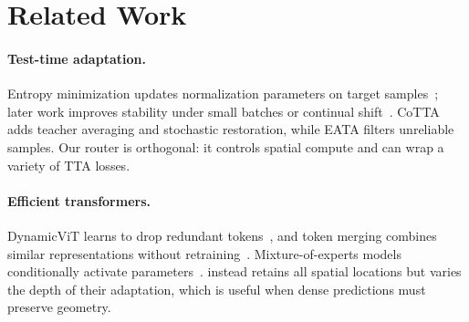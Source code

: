 \section{Related Work}
\label{sec:related}

\paragraph{Test-time adaptation.}
Entropy minimization updates normalization parameters on target
samples~\citep{wang2021tent}; later work improves stability under small batches
or continual shift~\citep{niu2022efficient,wang2022continual}.  CoTTA adds
teacher averaging and stochastic restoration, while EATA filters unreliable
samples.  Our router is orthogonal: it controls spatial compute and can wrap a
variety of TTA losses.

\paragraph{Efficient transformers.}
DynamicViT learns to drop redundant tokens~\citep{rao2021dynamicvit}, and token
merging combines similar representations without retraining~\citep{bolya2023tome}.
Mixture-of-experts models conditionally activate parameters~\citep{shazeer2017moe}.
\method{} instead retains all spatial locations but varies the depth of their
adaptation, which is useful when dense predictions must preserve geometry.

